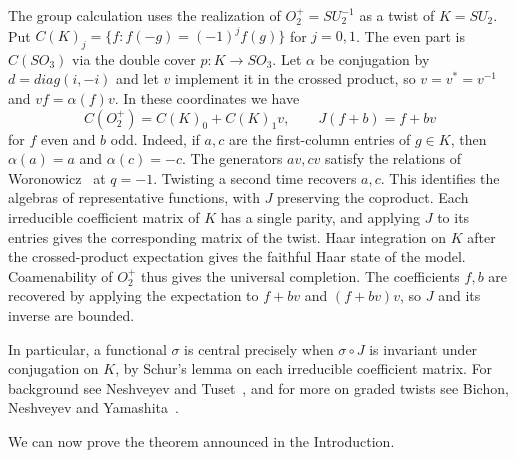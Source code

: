 \documentclass[11pt,a4paper]{article}
\begin{document}
The group calculation uses the realization of $O_2^+=SU_2^{-1}$ as a twist of $K=SU_2$. Put $C(K)_j=\{f:f(-g)=(-1)^jf(g)\}$ for $j=0,1$. The even part is $C(SO_3)$ via the double cover $p:K\to SO_3$. Let $\alpha$ be conjugation by $d=diag(i,-i)$ and let $v$ implement it in the crossed product, so $v=v^*=v^{-1}$ and $vf=\alpha(f)v$. In these coordinates we have
\[
 C(O_2^+)=C(K)_0+C(K)_1v,\qquad J(f+b)=f+bv
\]
for $f$ even and $b$ odd. Indeed, if $a,c$ are the first-column entries of $g\in K$, then $\alpha(a)=a$ and $\alpha(c)=-c$. The generators $av,cv$ satisfy the relations of Woronowicz~\cite{woro-su} at $q=-1$. Twisting a second time recovers $a,c$. This identifies the algebras of representative functions, with $J$ preserving the coproduct. Each irreducible coefficient matrix of $K$ has a single parity, and applying $J$ to its entries gives the corresponding matrix of the twist. Haar integration on $K$ after the crossed-product expectation gives the faithful Haar state of the model. Coamenability of $O_2^+$ thus gives the universal completion. The coefficients $f,b$ are recovered by applying the expectation to $f+bv$ and $(f+bv)v$, so $J$ and its inverse are bounded.

In particular, a functional $\sigma$ is central precisely when $\sigma\circ J$ is invariant under conjugation on $K$, by Schur's lemma on each irreducible coefficient matrix. For background see Neshveyev and Tuset~\cite{nt}, and for more on graded twists see Bichon, Neshveyev and Yamashita~\cite{bny}.

We can now prove the theorem announced in the Introduction.
\end{document}
